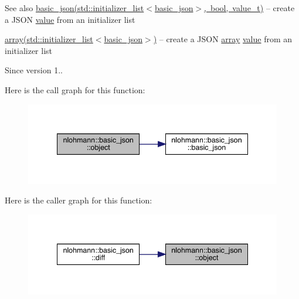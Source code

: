 \begin{DoxySeeAlso}{See also}
\mbox{\hyperlink{classnlohmann_1_1basic__json_afbad48316e7cd37366ba3ac5d7e5859e}{basic\+\_\+json(std\+::initializer\+\_\+list$<$basic\+\_\+json$>$, bool, value\+\_\+t)}} -- create a J\+S\+ON \mbox{\hyperlink{classnlohmann_1_1basic__json_af9c51328fbe1da75eca750be3009917a}{value}} from an initializer list 

\mbox{\hyperlink{classnlohmann_1_1basic__json_a4a4ec75e4d2845d9bcf7a9e5458e4949}{array(std\+::initializer\+\_\+list$<$basic\+\_\+json$>$)}} -- create a J\+S\+ON \mbox{\hyperlink{classnlohmann_1_1basic__json_a4a4ec75e4d2845d9bcf7a9e5458e4949}{array}} \mbox{\hyperlink{classnlohmann_1_1basic__json_af9c51328fbe1da75eca750be3009917a}{value}} from an initializer list
\end{DoxySeeAlso}
\begin{DoxySince}{Since}
version 1.. 
\end{DoxySince}
Here is the call graph for this function\+:
\nopagebreak
\begin{figure}[H]
\begin{center}
\leavevmode
\includegraphics[width=341pt]{classnlohmann_1_1basic__json_a9f42ee7d10eee2d5a73fd94ca7f767ca_cgraph}
\end{center}
\end{figure}
Here is the caller graph for this function\+:
\nopagebreak
\begin{figure}[H]
\begin{center}
\leavevmode
\includegraphics[width=341pt]{classnlohmann_1_1basic__json_a9f42ee7d10eee2d5a73fd94ca7f767ca_icgraph}
\end{center}
\end{figure}
\mbox{\label{classnlohmann_1_1basic__json_a26ef3058e249f82a04f8ec18f7419027}} 
